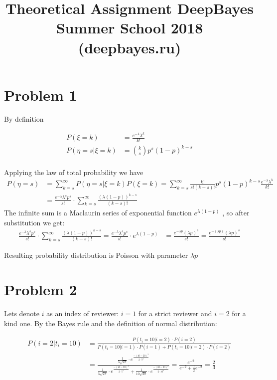 \documentclass[12pt]{article}
\title{
Theoretical Assignment
DeepBayes Summer School 2018 (deepbayes.ru)}
\begin{document}
\maketitle
\section{Problem 1}
By definition  \par
\begin{align*}
P(\xi = k) &= \frac{e^{-\lambda} \lambda^k}{k!} \\
P(\eta = s | \xi = k) &= \binom{k}{s} p^s (1-p)^{k-s} \\
\end{align*}


Applying the law of total probability we have
\begin{align*}
P(\eta = s) &= \sum_{k=s}^{\infty} P(\eta = s | \xi = k) P(\xi = k) 
= \sum_{k=s}^{\infty} \frac{k!}{s! (k - s)!} p^s (1-p)^{k-s}  \frac{e^{-\lambda} \lambda^k}{k!} \\
&= \frac{e^{-\lambda} \lambda^s p^s}{s!} \cdot \sum_{k=s}^{\infty} \frac{(\lambda (1 - p))^{k - s}}{(k-s)!}
\end{align*}
The infinite sum is a Maclaurin series of exponential function $e^{\lambda (1 - p)}$ , so after substitution we get:
\begin{align*}
\frac{e^{-\lambda} \lambda^s p^s}{s!} \cdot \sum_{k=s}^{\infty} \frac{(\lambda (1 - p))^{k - s}}{(k-s)!} = \frac{e^{-\lambda} \lambda^s p^s}{s!} \cdot e^{\lambda (1 - p)} 
&= \frac{e^{-\lambda p} (\lambda p)^s}{s!} 
= \frac{e^{-(\lambda p)} (\lambda p)^s}{s!} 
\end{align*}

Resulting probability distribution is Poisson with parameter $\lambda p$

\section{Problem 2}
Lets denote $i$ as an index of reviewer: $i = 1$ for a strict reviewer and $i = 2$ for a kind one.
By the Bayes rule and the definition of normal distribution: \par

\begin{align*}
P(i = 2 | t_i = 10) &= \frac{P(t_i = 10 | i = 2) \cdot P(i = 2)}{P(t_i = 10 | i = 1) \cdot P(i = 1) + P(t_i = 10 | i = 2) \cdot P(i = 2)} \\
 &= \frac{\frac{1}{5 \sqrt{2 \pi}} \cdot e^{\frac{-(10 - 20)^2}{2 \cdot 5^2}}}{\frac{1}{5 \sqrt{2 \pi}} \cdot e^{\frac{-(10 - 20)^2}{2 \cdot 5^2}} + \frac{1}{10 \sqrt{2 \pi}} \cdot e^{\frac{-(10 - 30)^2}{2 \cdot 10^2}}} 
 = \frac{e^{-2}}{e^{-2} + \frac{1}{2} e^{-2}} = \frac{2}{3}
\end{align*}
\end{document}
